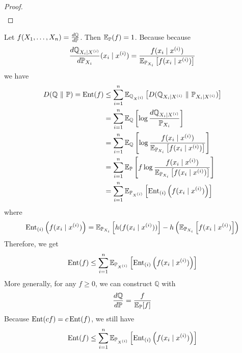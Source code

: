 \begin{enumerate}[label=\arabic{*}.]
\begin{proof}
\begin{equation*}
\begin{aligned}
	        \end{aligned}
	    \end{equation*}
	\end{proof}
	\begin{rmk}
	    Let $f(X_1,\dots,X_n) = \frac{d\mathbb{Q}}{d \mathbb{P}}$. Then $\mathbb{E}_{\mathbb{P}}(f) = 1$. Because
	    because
	    \begin{equation*}
	        \frac{d\mathbb{Q}_{X_i \mid X^{(i)}}}{d\mathbb{P}_{X_i}}(x_i \mid x^{(i)}) = \frac{f(x_i \mid x^{(i)})}{\mathbb{E}_{\mathbb{P}_{X_i}}\left[f(x_i \mid x^{(i)})\right]}
	    \end{equation*}
	    we have
	    \begin{equation*}
	        \begin{aligned}
	        	D(\mathbb{Q}~\Vert~\mathbb{P}) = \operatorname{Ent}(f) &\leq \sum_{i=1}^n\mathbb{E}_{\mathbb{Q}_{X^{(i)}}}\left[D(\mathbb{Q}_{X_i \mid X^{(i)}}~\Vert~\mathbb{P}_{X_i \mid X^{(i)}})\right] \\
	        	&= \sum_{i=1}^n\mathbb{E}_{\mathbb{Q}} \left[\log \frac{d\mathbb{Q}_{X_i \mid X^{(i)}}}{\mathbb{P}_{X_i}}\right] \\
	        	&= \sum_{i=1}^n\mathbb{E}_{\mathbb{Q}} \left[\log \frac{f(x_i \mid x^{(i)})}{\mathbb{E}_{\mathbb{P}_{X_i}}\left[f(x_i \mid x^{(i)})\right]}\right] \\
	        	&= \sum_{i=1}^n\mathbb{E}_{\mathbb{P}} \left[f\log \frac{f(x_i \mid x^{(i)})}{\mathbb{E}_{\mathbb{P}_{X_i}}\left[f(x_i \mid x^{(i)})\right]}\right] \\
	        	&=  \sum_{i=1}^n \mathbb{E}_{\mathbb{P}_{X^{(i)}}}\left[\operatorname{Ent}_{(i)}\left(f(x_i \mid x^{(i)})\right)\right]
	        \end{aligned}
	    \end{equation*}
	    where
	    \begin{equation*}
	        \operatorname{Ent}_{(i)}\left(f(x_i \mid x^{(i)})\right) = \mathbb{E}_{\mathbb{P}_{X_i}}\left[h(f(x_i \mid x^{(i)}))\right] - h\left(\mathbb{E}_{\mathbb{P}_{X_i}}\left[f(x_i \mid x^{(i)})\right]\right)
	    \end{equation*}
	    Therefore, we get
	    \begin{equation*}
	        \operatorname{Ent}(f) \leq \sum_{i=1}^n \mathbb{E}_{\mathbb{P}_{X^{(i)}}}\left[\operatorname{Ent}_{(i)}\left(f(x_i \mid x^{(i)})\right)\right]
	    \end{equation*}
	    More generally, for any $f \geq 0$, we can construct $\mathbb{Q}$ with
	    \begin{equation*}
	        \frac{d\mathbb{Q}}{d \mathbb{P}} = \frac{f}{\mathbb{E}_{\mathbb{P}}[f]}
	    \end{equation*}
	    Because $\operatorname{Ent}(cf) = c \operatorname{Ent}(f)$, we still have
	    \begin{equation*}
	        \op{Ent}(f) \leq \sum_{i=1}^n \E_{\mathbb{P}_{X^{(i)}}}\bj{\op{Ent}_{(i)}\bc{f(x_i \mid x^{(i)})}}

\end{equation*}
\end{rmk}
\end{enumerate}
